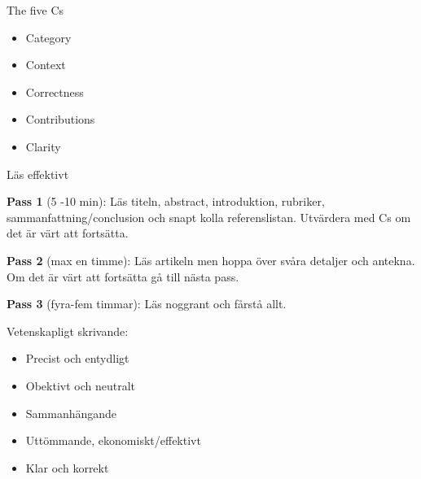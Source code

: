 \begin{multicols}{2}
The five Cs
\begin{itemize}
\item Category
\item Context
\item Correctness
\item Contributions
\item Clarity
\end{itemize}

Läs effektivt

\textbf{Pass 1} (5 -10 min): Läs titeln, abstract, introduktion, rubriker, sammanfattning/conclusion och snapt kolla referenslistan. Utvärdera med Cs om det är värt att fortsätta.

\textbf{Pass 2} (max en timme): Läs artikeln men hoppa över svåra detaljer och antekna. Om det är värt att fortsätta gå till nästa pass.

\textbf{Pass 3} (fyra-fem timmar): Läs noggrant och fårstå allt.

Vetenskapligt skrivande:
\begin{itemize}
\item Precist och entydligt
\item Obektivt och neutralt
\item Sammanhängande
\item Uttömmande, ekonomiskt/effektivt
\item Klar och korrekt
\end{itemize}
  

\end{multicols}
